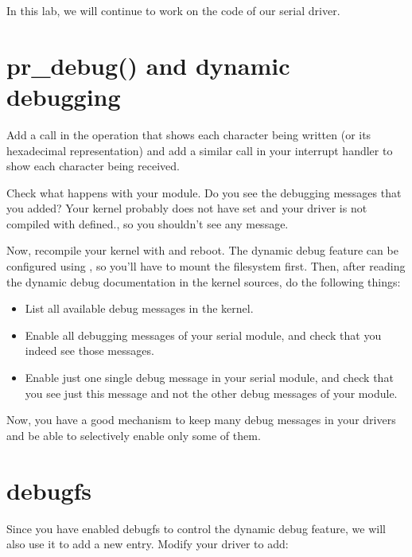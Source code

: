 
In this lab, we will continue to work on the code of our serial driver.

\section{pr\_debug() and dynamic debugging}

Add a  call in the  operation that shows
each character being written (or its hexadecimal representation) and
add a similar  call in your interrupt handler to show
each character being received.

Check what happens with your module. Do you see the debugging messages
that you added? Your kernel probably does not have
 set and your driver is not compiled with
 defined., so you shouldn't see any message.

Now, recompile your kernel with  and reboot. The
dynamic debug feature can be configured using , so you'll have
to mount the  filesystem first. Then, after reading the dynamic
debug documentation in the kernel sources, do the following things:

\begin{itemize}

\item List all available debug messages in the kernel.

\item Enable all debugging messages of your serial module, and check
  that you indeed see those messages.

\item Enable just one single debug message in your serial module, and
  check that you see just this message and not the other debug
  messages of your module.

\end{itemize}

Now, you have a good mechanism to keep many debug messages in your
drivers and be able to selectively enable only some of them.

\section{debugfs}

Since you have enabled debugfs to control the dynamic debug feature,
we will also use it to add a new  entry. Modify your driver to
add:

